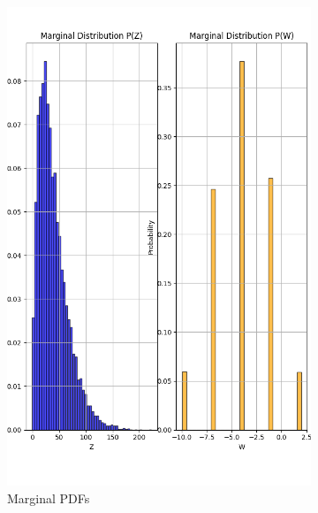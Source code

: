 \documentclass{article}
\begin{document}
\begin{figure}[H]
  \centering
  \begin{subfigure}{0.45\textwidth}
    \centering
    \includegraphics[width=\linewidth]{results/section3/c(1).png}
    \caption{Marginal PDFs}
  \end{subfigure}
  \hfill
  \begin{subfigure}{0.45\textwidth}
    \centering

\end{subfigure}
\end{figure}
\end{document}

